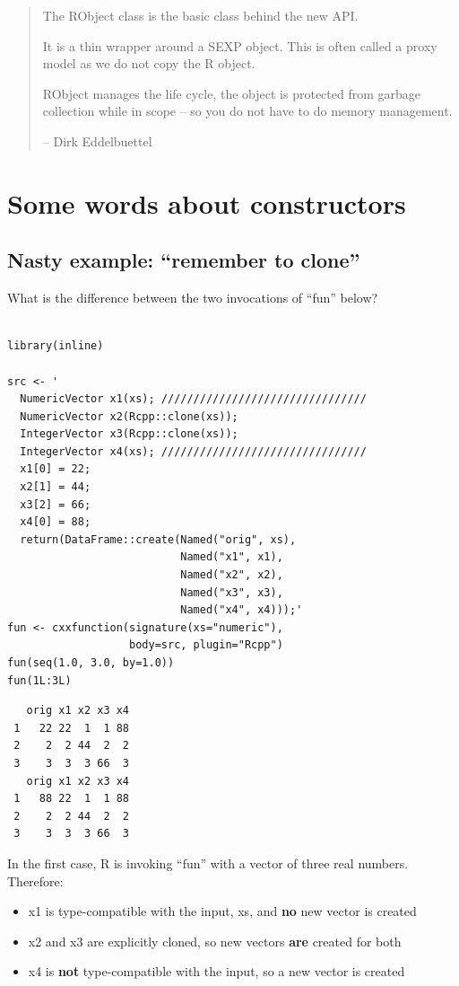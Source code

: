 \documentclass[11pt]{article}
\begin{document}
\begin{quote}

The RObject class is the basic class behind the new API.

It is a thin wrapper around a SEXP object.  This is often called a
proxy model as we do not copy the R object.

RObject manages the life cycle, the object is protected from
garbage collection while in scope -- so you do not have to do
memory management.

-- Dirk Eddelbuettel


\end{quote}
\section{Some words about constructors}
\label{sec-5}
\subsection{Nasty example: ``remember to clone''}
\label{sec-5-1}


What is the difference between the two invocations of ``fun'' below?


\begin{verbatim}

library(inline)

src <- '
  NumericVector x1(xs); ////////////////////////////////
  NumericVector x2(Rcpp::clone(xs));
  IntegerVector x3(Rcpp::clone(xs));
  IntegerVector x4(xs); ////////////////////////////////
  x1[0] = 22;
  x2[1] = 44;
  x3[2] = 66;
  x4[0] = 88;
  return(DataFrame::create(Named("orig", xs),
                           Named("x1", x1),
                           Named("x2", x2),
                           Named("x3", x3),
                           Named("x4", x4)));'
fun <- cxxfunction(signature(xs="numeric"),
                   body=src, plugin="Rcpp")
fun(seq(1.0, 3.0, by=1.0))
fun(1L:3L)
\end{verbatim}

\begin{verbatim}
   orig x1 x2 x3 x4
 1   22 22  1  1 88
 2    2  2 44  2  2
 3    3  3  3 66  3
   orig x1 x2 x3 x4
 1   88 22  1  1 88
 2    2  2 44  2  2
 3    3  3  3 66  3
\end{verbatim}

In the first case, R is invoking ``fun'' with a vector of three real
numbers.  Therefore:

\begin{itemize}
\item x1 is type-compatible with the input, xs, and \textbf{no} new vector is
    created
\item x2 and x3 are explicitly cloned, so new vectors \textbf{are} created for
    both
\item x4 is \textbf{not} type-compatible with the input, so a new vector is
    created
\end{itemize}
\end{document}
